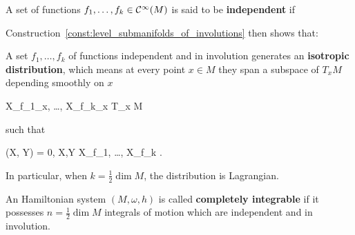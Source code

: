\documentclass[main.tex]{subfiles}
\begin{document}
\begin{definition}
	A set of functions $f_1, \ldots, f_k \in \mathcal{C}^\infty(M)$ is said to be \textbf{independent} if
	\begin{eqalign}
	\end{eqalign}
\end{definition}

Construction~\ref{const:level_submanifolds_of_involutions} then shows that:

\begin{lemma}
\label{lemma:isotropic_dist}
	A set $f_1, \ldots, f_k$ of functions independent and in involution generates an \textbf{isotropic distribution}, which means at every point $x \in M$ they span a subspace of $T_xM$ depending smoothly on $x$
	\begin{eqalign}
		\langle X_{f_1}\vert_x, \ldots, X_{f_k}\vert_x \rangle {}\subseteq T_x M
	\end{eqalign}
	such that
	\begin{eqalign}
		\omega(X, Y) = 0, \quad \forall X,Y \in \langle X_{f_1}, \ldots, X_{f_k} \rangle.
	\end{eqalign}
	In particular, when $k = \frac12 \dim M$, the distribution is Lagrangian.
\end{lemma}

\begin{definition}
	An Hamiltonian system $(M, \omega, h)$ is called \textbf{completely integrable} if it possesses $n=\frac12 \dim M$ integrals of motion which are independent and in involution.
\end{definition}
\end{document}
